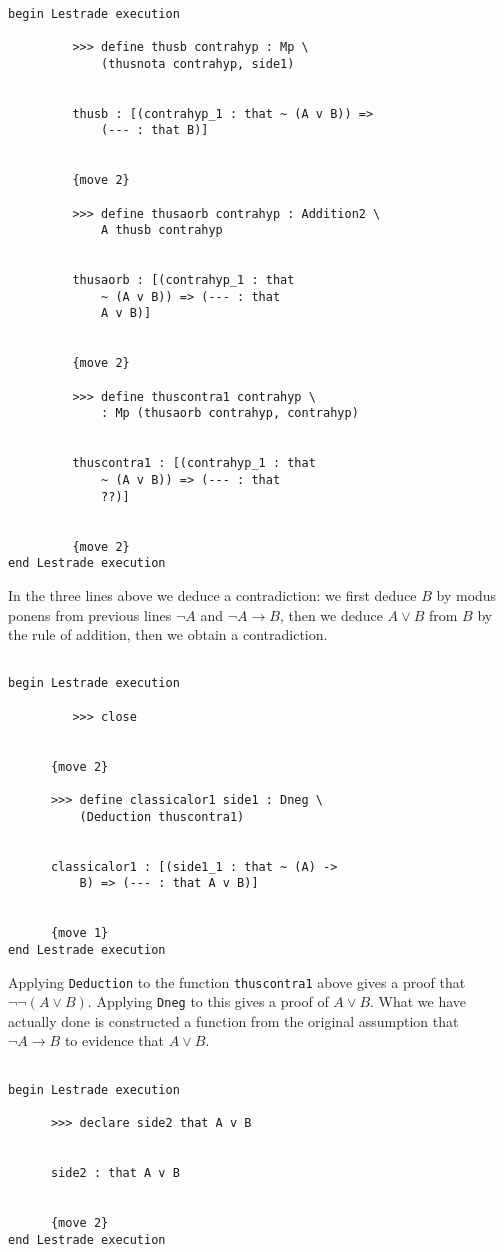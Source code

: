 \documentclass[12pt]{article}
\begin{document}
\begin{verbatim}

begin Lestrade execution

         >>> define thusb contrahyp : Mp \
             (thusnota contrahyp, side1)


         thusb : [(contrahyp_1 : that ~ (A v B)) => 
             (--- : that B)]


         {move 2}

         >>> define thusaorb contrahyp : Addition2 \
             A thusb contrahyp


         thusaorb : [(contrahyp_1 : that 
             ~ (A v B)) => (--- : that 
             A v B)]


         {move 2}

         >>> define thuscontra1 contrahyp \
             : Mp (thusaorb contrahyp, contrahyp)


         thuscontra1 : [(contrahyp_1 : that 
             ~ (A v B)) => (--- : that 
             ??)]


         {move 2}
end Lestrade execution
\end{verbatim}

In the three lines above we deduce a contradiction:  we first deduce $B$ by modus ponens from previous lines $\neg A$ and $\neg A \rightarrow B$,
then we deduce $A \vee B$ from $B$ by the rule of addition, then we obtain a contradiction.

\begin{verbatim}

begin Lestrade execution

         >>> close


      {move 2}

      >>> define classicalor1 side1 : Dneg \
          (Deduction thuscontra1)


      classicalor1 : [(side1_1 : that ~ (A) -> 
          B) => (--- : that A v B)]


      {move 1}
end Lestrade execution
\end{verbatim}

Applying {\tt Deduction} to the function {\tt thuscontra1} above gives a proof that $\neg \neg (A \vee B)$.  Applying {\tt Dneg} to this gives a proof
of $A \vee B$.  What we have actually done is constructed a function from the original assumption that $\neg A \rightarrow B$ to evidence that $A \vee B$.

\begin{verbatim}

begin Lestrade execution

      >>> declare side2 that A v B


      side2 : that A v B


      {move 2}
end Lestrade execution
\end{verbatim}
\end{document}
